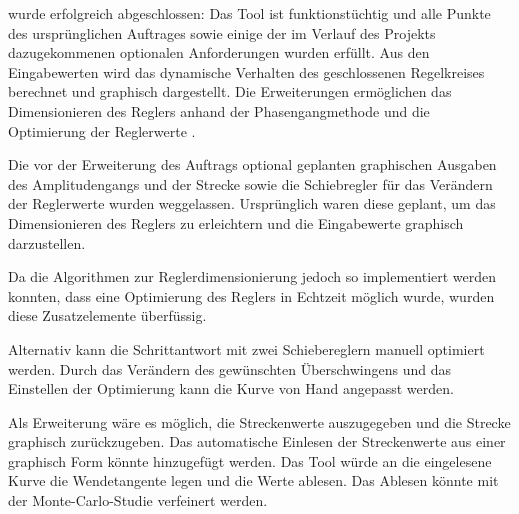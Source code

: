 wurde  erfolgreich abgeschlossen: Das  Tool  ist  funktionst\"uchtig und  alle
Punkte  des  urspr\"unglichen  Auftrages  sowie  einige  der  im  Verlauf  des
Projekts  dazugekommenen optionalen  Anforderungen  wurden erf\"ullt. Aus  den
Eingabewerten  wird das  dynamische Verhalten  des geschlossenen  Regelkreises
berechnet und graphisch  dargestellt.  Die Erweiterungen {} erm\"oglichen  das  Dimensionieren
des   Reglers   anhand  der   Phasengangmethode   und   die  Optimierung   der
Reglerwerte {}.

Die vor  der Erweiterung des Auftrags {}
optional geplanten  graphischen Ausgaben  des Amplitudengangs und  der Strecke
sowie  die   Schiebregler  f\"ur   das  Ver\"andern  der   Reglerwerte  wurden
weggelassen. Urspr\"unglich  waren diese  geplant, um  das Dimensionieren  des
Reglers zu erleichtern und die Eingabewerte graphisch darzustellen.

Da die  Algorithmen zur  Reglerdimensionierung jedoch so  implementiert werden
konnten, dass eine Optimierung des Reglers in Echtzeit m\"oglich wurde, wurden
diese Zusatzelemente \"uberf\"ussig.

Alternativ kann  die Schrittantwort mit zwei  Schiebereglern manuell optimiert
werden. Durch  das  Ver\"andern  des gew\"unschten  \"Uberschwingens  und  das
Einstellen der Optimierung kann die Kurve von Hand angepasst werden.

Als  Erweiterung  w\"are  es  m\"oglich, die  Streckenwerte  auszugegeben  und
die   Strecke  graphisch   zur\"uckzugeben. Das   automatische  Einlesen   der
Streckenwerte  aus einer  graphisch  Form  k\"onnte hinzugef\"ugt  werden. Das
Tool  w\"urde  an  die  eingelesene  Kurve die  Wendetangente  legen  und  die
Werte  ablesen. Das Ablesen  k\"onnte  mit  der Monte-Carlo-Studie  verfeinert
werden.{}
